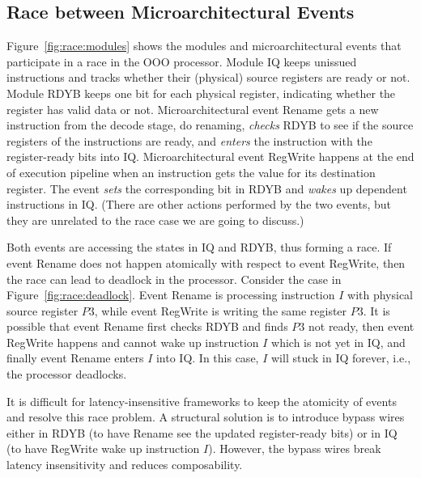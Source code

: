 \documentclass[conference]{IEEEtran}
\begin{document}
\subsection{Race between Microarchitectural Events}\label{sec:cmd:iq}
Figure~\ref{fig:race:modules} shows the modules and microarchitectural events that participate in a race in the OOO processor.
Module IQ keeps unissued instructions and tracks whether their (physical) source registers are ready or not.
Module RDYB keeps one bit for each physical register, indicating whether the register has valid data or not.
Microarchitectural event {Rename} gets a new instruction from the decode stage, do renaming, \emph{checks} RDYB to see if the source registers of the instructions are ready, and \emph{enters} the instruction with the register-ready bits into IQ.
Microarchitectural event {RegWrite} happens at the end of execution pipeline when an instruction gets the value for its destination register.
The event \emph{sets} the corresponding bit in RDYB and \emph{wakes} up dependent instructions in IQ.
(There are other actions performed by the two events, but they are unrelated to the race case we are going to discuss.)

Both events are accessing the states in IQ and RDYB, thus forming a race.
If event Rename does not happen atomically with respect to event RegWrite, then the race can lead to deadlock in the processor.
Consider the case in Figure~\ref{fig:race:deadlock}.
Event Rename is processing instruction $I$ with physical source register $P3$, while event RegWrite is writing the same register $P3$.
It is possible that event Rename first checks RDYB and finds $P3$ not ready, then event RegWrite happens and cannot wake up instruction $I$ which is not yet in IQ, and finally event Rename enters $I$ into IQ.
In this case, $I$ will stuck in IQ forever, i.e., the processor deadlocks.

It is difficult for latency-insensitive frameworks to keep the atomicity of events and resolve this race problem.
A structural solution is to introduce bypass wires either in RDYB (to have Rename see the updated register-ready bits) or in IQ (to have RegWrite wake up instruction $I$).
However, the bypass wires break latency insensitivity and reduces composability.
\end{document}
